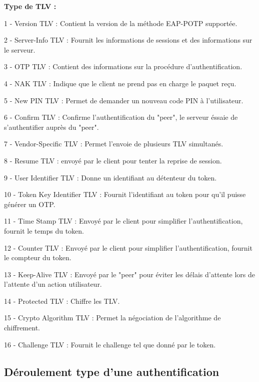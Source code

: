 \documentclass{../res/univ-projet}
\begin{document}
\begin{description}
   \item \textbf{Type de TLV :}
\item   1 - Version TLV : Contient la version de la méthode EAP-POTP supportée.
\item   2 - Server-Info TLV : Fournit les informations de sessions et des informations sur le serveur.
\item   3 - OTP TLV : Contient des informations sur la procédure d'authentification.
\item   4 - NAK TLV : Indique que le client ne prend pas en charge le paquet reçu.
\item   5 - New PIN TLV : Permet de demander un nouveau code PIN à l'utilisateur.
\item   6 - Confirm TLV : Confirme l'authentification du "peer", le serveur éssaie de s'authentifier auprès du "peer".
\item   7 - Vendor-Specific TLV : Permet l'envoie de plusieurs TLV simultanés.
\item   8 - Resume TLV : envoyé par le client pour tenter la reprise de session.
\item   9 - User Identifier TLV : Donne un identifiant au détenteur du token.
\item 10 - Token Key Identifier TLV : Fournit l'identifiant au token pour qu'il puisse générer un OTP.
\item 11 - Time Stamp TLV : Envoyé par le client pour simplifier l'authentification, fournit le temps du token.
\item 12 - Counter TLV : Envoyé par le client pour simplifier l'authentification, fournit le compteur du token.
\item 13 - Keep-Alive TLV : Envoyé par le "peer" pour éviter les délais d'attente lors de l'attente d'un action utilisateur.
\item 14 - Protected TLV : Chiffre les TLV.
\item 15 - Crypto Algorithm TLV : Permet la négociation de l'algorithme de chiffrement.
\item 16 - Challenge TLV : Fournit le challenge tel que donné par le token.
\end{description}


\subsection{Déroulement type d'une authentification}
\end{document}
